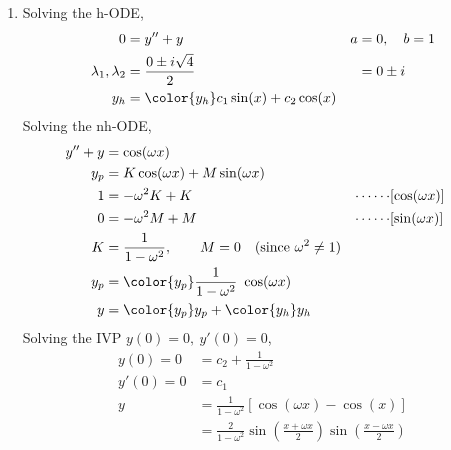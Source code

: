 \begin{enumerate}
    \item Solving the h-ODE,
          \begin{align}
              0                        & = y'' + y                                 & a & = 0, \quad b = 1 \\
              \lambda_{1}, \lambda_{2} & = \frac{0 \pm i\sqrt{4}}{2}               &   & = 0 \pm i        \\
              y_{h}                    & = \color{y_h} c_{1}\sin(x) + c_{2}\cos(x)
          \end{align}
          Solving the nh-ODE,
          \begin{align}
              y'' + y & = \cos(\omega x)                                                                                                   \\
              y_{p}   & = K \cos(\omega x) + M \sin(\omega x)                                                                              \\
              1       & = -\omega^{2}K + K                                                               & \cdots\cdots & [\cos(\omega x)] \\
              0       & = -\omega^{2}M + M                                                               & \cdots\cdots & [\sin(\omega x)] \\
              K       & = \frac{1}{1 - \omega^{2}}, \qquad M = 0 \quad (\text{since}\ \omega^{2} \neq 1)                                   \\
              y_{p}   & = \color{y_p} \frac{1}{1 - \omega^{2}}\ \cos(\omega x)                                                             \\
              y       & = {\color{y_p} y_{p}} + {\color{y_h} y_{h}}
          \end{align}
          Solving the IVP $ y(0) = 0,\ y'(0) = 0 $,
          \begin{align}
              y(0) = 0  & = c_{2} + \frac{1}{1 - \omega^{2}}                                  \\
              y'(0) = 0 & = c_{1}                                                             \\
              y         & = \frac{1}{1 - \omega^{2}} [\cos(\omega x) - \cos(x)]               \\
                        & = \frac{2}{1 - \omega^{2}}\sin\left( \frac{x + \omega x}{2} \right)
              \sin\left( \frac{x - \omega x}{2} \right)
          \end{align}

\end{enumerate}
